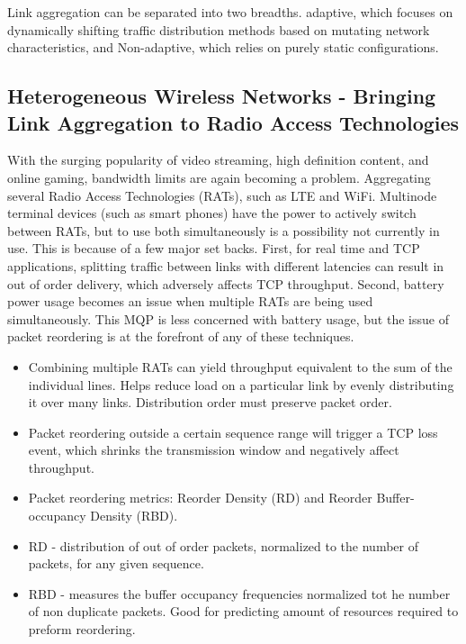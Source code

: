 \documentclass[12pt]{article}
\begin{document}
	Link aggregation can be separated into two breadths. adaptive, which focuses on dynamically shifting traffic distribution methods based on mutating network characteristics, and Non-adaptive, which relies on purely static configurations. \\


	\subsection{Heterogeneous Wireless Networks - Bringing Link Aggregation to Radio Access Technologies}

		With the surging popularity of video streaming, high definition content, and online gaming, bandwidth limits are again becoming a problem. Aggregating several Radio Access Technologies (RATs), such as LTE and WiFi. Multinode terminal devices (such as smart phones) have the power to actively switch between RATs, but to use both simultaneously is a possibility not currently in use. This is because of a few major set backs. First, for real time and TCP applications, splitting traffic between links with different latencies can result in out of order delivery, which adversely affects TCP throughput. Second, battery power usage becomes an issue when multiple RATs are being used simultaneously. This MQP is less concerned with battery usage, but the issue of packet reordering is at the forefront of any of these techniques. \\

		\begin{itemize}

			\item Combining multiple RATs can yield throughput equivalent to the sum of the individual lines. Helps reduce load on a particular link by evenly distributing it over many links. Distribution order must preserve packet order. 

			\item Packet reordering outside a certain sequence range will trigger a TCP loss event, which shrinks the transmission window and negatively affect throughput.

			\item Packet reordering metrics: Reorder Density (RD) and Reorder Buffer-occupancy Density (RBD). 

			\item RD - distribution of out of order packets, normalized to the number of packets, for any given sequence.

			\item RBD - measures the buffer occupancy frequencies normalized tot he number of non duplicate packets. Good for predicting amount of resources required to preform reordering.

		\end{itemize}
\end{document}
